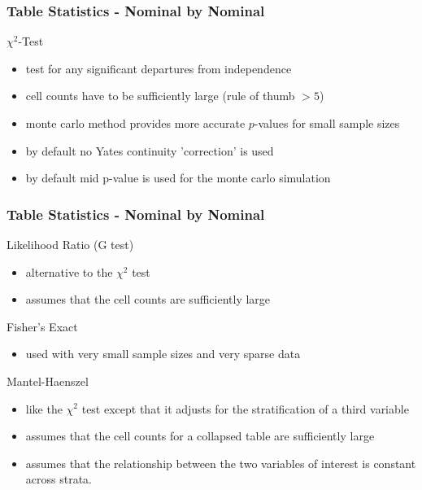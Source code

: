 \documentclass[xcolor={table},c]{beamer}
\begin{document}
\begin{frame}\frametitle{Table Statistics - Nominal by Nominal}
\begin{alertblock}{$\chi^2$-Test}
\begin{itemize} 
   \item test for any significant departures from independence
   \item cell counts have to be sufficiently large (rule of thumb $>5$)
   \item monte carlo method provides more accurate $p$-values for small sample sizes
   \item by default no Yates continuity 'correction' is used
   \item by default mid p-value is used for the monte carlo simulation
\end{itemize}
\end{alertblock}
\end{frame}

\begin{frame}[shrink=5]\frametitle{Table Statistics - Nominal by Nominal}
\begin{alertblock}{Likelihood Ratio (G test)}
  \begin{itemize}
  \item alternative to the $\chi^2$ test
  \item assumes that the cell counts are sufficiently large
  \end{itemize}
\end{alertblock}
\begin{alertblock}{Fisher's Exact}
\begin{itemize}
\item  used with very small sample sizes and very sparse data
\end{itemize}
\end{alertblock}
\begin{alertblock}{Mantel-Haenszel} 
\begin{itemize}
\item like the $\chi^2$ test except that it adjusts for the stratification of a third variable
\item assumes that the cell counts for a collapsed table  are sufficiently large 
\item assumes that the relationship between the two variables of interest is constant across strata. 
\end{itemize}
\end{alertblock}
\end{frame}
\end{document}
